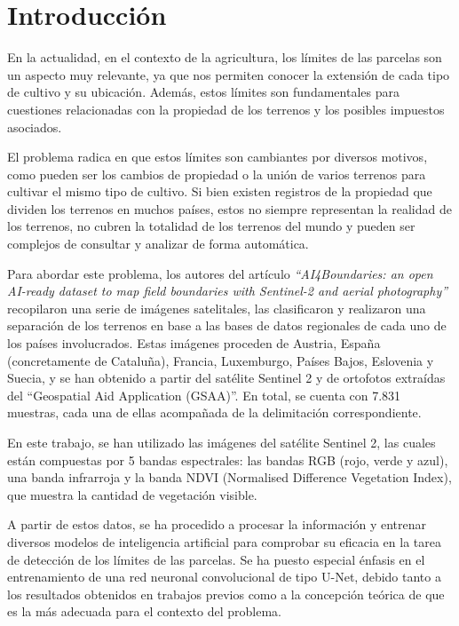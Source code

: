 \chapter{Introducción}

En la actualidad, en el contexto de la agricultura, los límites de las parcelas son un aspecto muy relevante, ya que nos permiten conocer la extensión de cada tipo de cultivo y su ubicación. Además, estos límites son fundamentales para cuestiones relacionadas con la propiedad de los terrenos y los posibles impuestos asociados.

El problema radica en que estos límites son cambiantes por diversos motivos, como pueden ser los cambios de propiedad o la unión de varios terrenos para cultivar el mismo tipo de cultivo. Si bien existen registros de la propiedad que dividen los terrenos en muchos países, estos no siempre representan la realidad de los terrenos, no cubren la totalidad de los terrenos del mundo y pueden ser complejos de consultar y analizar de forma automática.

Para abordar este problema, los autores del artículo \textit{``AI4Boundaries: an open AI-ready dataset to map field boundaries with Sentinel-2 and aerial photography''}\cite{AI4boundaries} recopilaron una serie de imágenes satelitales, las clasificaron y realizaron una separación de los terrenos en base a las bases de datos regionales de cada uno de los países involucrados. Estas imágenes proceden de Austria, España (concretamente de Cataluña), Francia, Luxemburgo, Países Bajos, Eslovenia y Suecia, y se han obtenido a partir del satélite Sentinel 2 y de ortofotos extraídas del ``Geospatial Aid Application (GSAA)''. En total, se cuenta con 7.831 muestras, cada una de ellas acompañada de la delimitación correspondiente.

En este trabajo, se han utilizado las imágenes del satélite Sentinel 2, las cuales están compuestas por 5 bandas espectrales: las bandas RGB (rojo, verde y azul), una banda infrarroja y la banda NDVI (Normalised Difference Vegetation Index), que muestra la cantidad de vegetación visible.

A partir de estos datos, se ha procedido a procesar la información y entrenar diversos modelos de inteligencia artificial para comprobar su eficacia en la tarea de detección de los límites de las parcelas. Se ha puesto especial énfasis en el entrenamiento de una red neuronal convolucional de tipo U-Net, debido tanto a los resultados obtenidos en trabajos previos como a la concepción teórica de que es la más adecuada para el contexto del problema.


